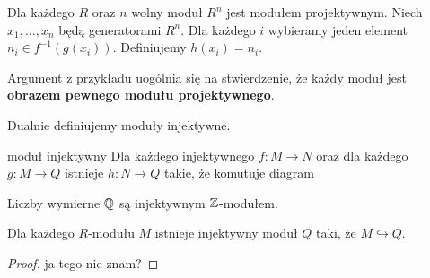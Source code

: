 \begin{example}[m]
  Dla każdego $R$ oraz $n$ wolny moduł $R^n$ jest modułem projektywnym. Niech $x_1,..., x_n$ będą generatorami $R^n$. Dla każdego $i$ wybieramy jeden element $n_i\in f^{-1}(g(x_i))$. Definiujemy $h(x_i)=n_i$.
\end{example}

Argument z przykładu uogólnia się na stwierdzenie, że każdy moduł jest \textbf{obrazem pewnego modułu projektywnego}.

Dualnie definiujemy moduły injektywne.

\begin{definition}{moduł injektywny}{}
  Dla każdego injektywnego $f:M\to N$ oraz dla każdego $g:M\to Q$ istnieje $h:N\to Q$ takie, że komutuje diagram
  \begin{center}
  \end{center}
\end{definition}

\begin{example}
Liczby wymierne $\mathbb{Q}$ są injektywnym $\mathbb{Z}$-modułem.
\end{example}

\begin{theorem}{}{}
  Dla każdego $R$-modułu $M$ istnieje injektywny moduł $Q$ taki, że $M\hookrightarrow Q$.
\end{theorem}

\begin{proof}
  \color{red} ja tego nie znam?
\end{proof}



